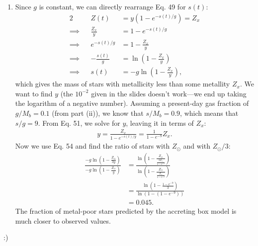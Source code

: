\documentclass[11pt,letterpaper]{article}
\begin{document}
\begin{enumerate}[label=(\roman*)]
\item Since $g$ is constant, we can directly rearrange Eq. 49 for $s(t)$:
    \begin{alignat}{2}
        &&Z(t) &= y(1 - e^{-s(t)/g}) = Z_x\\
        \implies&&\frac{Z_x}{y} &= 1 - e^{-s(t)/g} \\
        \implies&&e^{-s(t)/g} &= 1-\frac{Z_x}{y} \\
        \implies&&-\frac{s(t)}{g} &= \ln{(1-\frac{Z_x}{y})} \\
        \implies&&s(t) &= -g\ln{(1-\frac{Z_x}{y})},
    \end{alignat}
    which gives the mass of stars with metallicity less than some metallity $Z_x$. We want to find $y$ (the $10^{-2}$ given in the slides doesn't work—we end up taking the logarithm of a negative number). Assuming a present-day gas fraction of $g/M_b = 0.1$ (from part (ii)), we know that $s/M_b = 0.9$, which means that $s/g = 9$. From Eq. 51, we solve for $y$, leaving it in terms of $Z_x$:
    \begin{align}
        y = \frac{Z_x}{1-e^{-s(t)/g}} = \frac{1}{1-e^{-9}}Z_x.
    \end{align}
    Now we use Eq. 54 and find the ratio of stars with $Z_\odot$ and with $Z_\odot/3$:
    \begin{align}
        \frac{-g\ln{(1-\frac{Z_\odot}{3y})}}{-g\ln{(1-\frac{Z_\odot}{y})}} &= \frac{\ln{(1-\frac{Z_\odot}{\frac{3Z_\odot}{1-e^{-9}}})}}{\ln{(1-\frac{Z_\odot}{\frac{Z_\odot}{1-e^{-9}}})}} \\
        &= \frac{\ln{(1-\frac{1-e^{-9}}{3})}}{\ln{(1-(1-e^{-9}))}} \\
        &= 0.045.
    \end{align}
    The fraction of metal-poor stars predicted by the accreting box model is much closer to observed values. 
\end{enumerate}

:)
\end{document}
